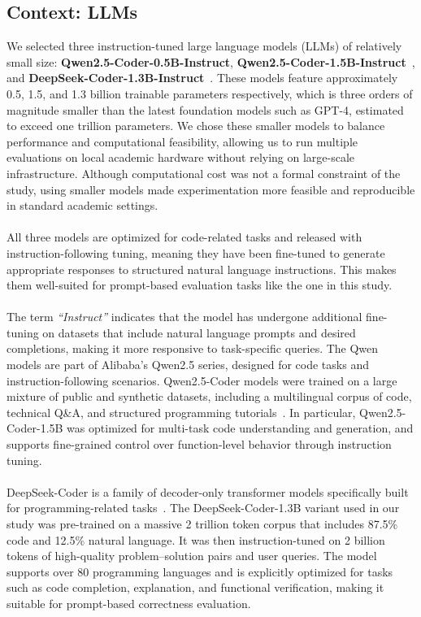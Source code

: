 \documentclass[a4paper]{usiinfbachelorproject}
\begin{document}
\subsection{Context: LLMs}\label{sec:llms}
We selected three instruction-tuned large language models (LLMs) of relatively small size: \textbf{Qwen2.5-Coder-0.5B-Instruct}, \textbf{Qwen2.5-Coder-1.5B-Instruct}~\cite{qwen2024report}, and \textbf{DeepSeek-Coder-1.3B-Instruct}~\cite{deepseek2024report}. These models feature approximately 0.5, 1.5, and 1.3 billion trainable parameters respectively, which is three orders of magnitude smaller than the latest foundation models such as GPT-4, estimated to exceed one trillion parameters. We chose these smaller models to balance performance and computational feasibility, allowing us to run multiple evaluations on local academic hardware without relying on large-scale infrastructure. Although computational cost was not a formal constraint of the study, using smaller models made experimentation more feasible and reproducible in standard academic settings.\\
\\[2pt]
All three models are optimized for code-related tasks and released with instruction-following tuning, meaning they have been fine-tuned to generate appropriate responses to structured natural language instructions. This makes them well-suited for prompt-based evaluation tasks like the one in this study.\\
\\[2pt]
The term \emph{“Instruct”} indicates that the model has undergone additional fine-tuning on datasets that include natural language prompts and desired completions, making it more responsive to task-specific queries. The Qwen models are part of Alibaba’s Qwen2.5 series, designed for code tasks and instruction-following scenarios. Qwen2.5-Coder models were trained on a large mixture of public and synthetic datasets, including a multilingual corpus of code, technical Q\&A, and structured programming tutorials~\cite{qwen2024report}. In particular, Qwen2.5-Coder-1.5B was optimized for multi-task code understanding and generation, and supports fine-grained control over function-level behavior through instruction tuning.\\
\\[2pt]
DeepSeek-Coder is a family of decoder-only transformer models specifically built for programming-related tasks~\cite{deepseek2024report}. The DeepSeek-Coder-1.3B variant used in our study was pre-trained on a massive 2 trillion token corpus that includes 87.5\% code and 12.5\% natural language. It was then instruction-tuned on 2 billion tokens of high-quality problem–solution pairs and user queries. The model supports over 80 programming languages and is explicitly optimized for tasks such as code completion, explanation, and functional verification, making it suitable for prompt-based correctness evaluation.\\
\end{document}
